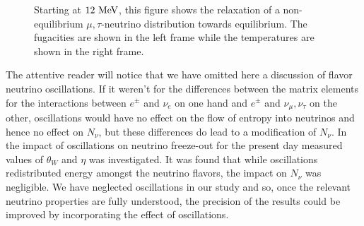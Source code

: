 \begin{figure} 

\begin{minipage}{\linewidth}
\end{minipage}
\caption{Starting at $12\text{ MeV}$, this figure shows the relaxation of a non-equilibrium $\mu,\tau$-neutrino distribution towards equilibrium. The fugacities are shown in the left frame while the temperatures are shown in the right frame.\label{fig:relax}}
 \end{figure}



The attentive reader will notice that we have omitted here a discussion of flavor neutrino oscillations. If it weren't for the differences between the matrix elements for the interactions between $e^\pm$ and $\nu_e$ on one hand and $e^\pm$ and $\nu_\mu,\nu_\tau$ on the other, oscillations would have no effect on the flow of entropy into neutrinos and hence no effect on $N_\nu$, but these differences do lead to a modification of $N_\nu$.  In \cite{Mangano2005} the impact of oscillations on neutrino freeze-out for the present day measured values of $\theta_W$ and $\eta$ was investigated.  It was found  that while oscillations redistributed energy amongst the neutrino flavors, the impact on $N_\nu$ was negligible. We have neglected oscillations in our study and so, once the relevant neutrino properties are fully understood, the precision of the results could be improved by incorporating the effect of oscillations.




